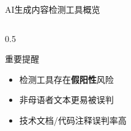 \documentclass[aspectratio=169,11pt]{beamer}
\begin{document}
\begin{frame}{AI生成内容检测工具概览}
\begin{columns}
\begin{column}{0.5\textwidth}
            \vspace{0.3cm}
            \begin{alertblock}{重要提醒}
                \small
                \begin{itemize}
                    \item 检测工具存在\textbf{假阳性}风险
                    \item 非母语者文本更易被误判
                    \item 技术文档/代码注释误判率高
                \end{itemize}
            \end{alertblock}
        \end{column}
    \end{columns}
\end{frame}
\end{document}
